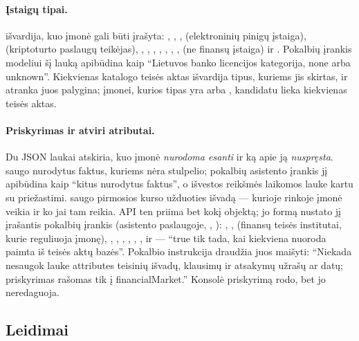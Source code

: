 \paragraph{Įstaigų tipai.}  išvardija, kuo įmonė gali būti įrašyta:
, , ,  (elektroninių pinigų
įstaiga),  (kriptoturto paslaugų teikėjas), ,
, , ,
, , ,  (ne finansų
įstaiga) ir . Pokalbių įrankis modeliui šį lauką apibūdina kaip
\enquote{Lietuvos banko licencijos kategorija, none arba unknown}. Kiekvienas katalogo teisės
aktas išvardija tipus, kuriems jis skirtas, ir atranka juos palygina; įmonei, kurios tipas yra
 arba , kandidatu lieka kiekvienas teisės aktas.

\paragraph{Priskyrimas ir atviri atributai.} Du JSON laukai atskiria, kuo įmonė \emph{nurodoma
esanti} ir ką apie ją \emph{nuspręsta}.  saugo nurodytus faktus, kuriems nėra
stulpelio; pokalbių asistento įrankis jį apibūdina kaip \enquote{kitus nurodytus faktus}, o
išvestos reikšmės laikomos lauke  kartu su priežastimi.
 saugo pirmosios kurso užduoties išvadą --- kurioje rinkoje įmonė veikia
ir ko jai tam reikia. API ten priima bet kokį objektą; jo formą nustato jį įrašantis pokalbių
įrankis (asistento paslaugoje, , ):
, ,  (finansų teisės institutai, kurie
reguliuoja įmonę), , , ,
, , ,  ir
 --- \enquote{true tik tada, kai kiekviena nuoroda paimta iš teisės aktų bazės}.
Pokalbio instrukcija draudžia juos maišyti: \enquote{Niekada nesaugok lauke attributes
teisinių išvadų, klausimų ir atsakymų užrašų ar datų; priskyrimas rašomas tik į
financialMarket.} Konsolė priskyrimą rodo, bet jo neredaguoja.

\subsection{Leidimai}\label{sec:company:credentials}


